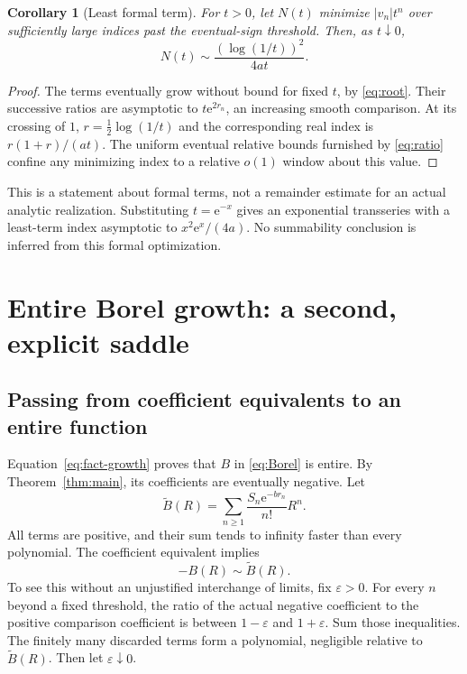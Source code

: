\documentclass[11pt,a4paper]{article}
\numberwithin{equation}{section}
\newtheorem{corollary}[theorem]{Corollary}
\theoremstyle{definition}
\theoremstyle{remark}\newtheorem{remark}[theorem]{Remark}
\newcommand{\ee}{\mathrm e}\newcommand{\dd}{\mathrm d}
\begin{document}
\begin{corollary}[Least formal term]
For $t>0$, let $N(t)$ minimize $|v_n|t^n$ over sufficiently large indices
past the eventual-sign threshold. Then, as $t\downarrow0$,
\begin{equation}
 N(t)\sim\frac{(\log(1/t))^2}{4at}.
 \label{eq:least}
\end{equation}
\end{corollary}
\begin{proof}
The terms eventually grow without bound for fixed $t$, by
\eqref{eq:root}. Their successive ratios are asymptotic to
$t\ee^{2r_n}$, an increasing smooth comparison.
At its crossing of $1$, $r=\frac12\log(1/t)$ and the corresponding real
index is $r(1+r)/(at)$. The uniform eventual relative bounds furnished by
\eqref{eq:ratio} confine any minimizing index to a relative $o(1)$
window about this value.
\end{proof}

This is a statement about formal terms, not a remainder estimate for an
actual analytic realization. Substituting $t=\ee^{-x}$ gives an exponential
transseries with a least-term index asymptotic to $x^2\ee^x/(4a)$.
No summability conclusion is inferred from this formal optimization.

\section{Entire Borel growth: a second, explicit saddle}
\label{sec:borel}

\subsection{Passing from coefficient equivalents to an entire function}
Equation~\eqref{eq:fact-growth} proves that $B$ in \eqref{eq:Borel} is entire.
By Theorem~\ref{thm:main}, its coefficients are eventually negative.
Let
\[
 \widetilde B(R)=\sum_{n\ge1}\frac{S_n\ee^{-br_n}}{n!}R^n.
\]
All terms are positive, and their sum tends to infinity faster than every
polynomial. The coefficient equivalent implies
\begin{equation}
 -B(R)\sim\widetilde B(R).
 \label{eq:Btransfer}
\end{equation}
To see this without an unjustified interchange of limits, fix $\varepsilon>0$.
For every $n$ beyond a fixed threshold, the ratio of the actual negative
coefficient to the positive comparison coefficient is between
$1-\varepsilon$ and $1+\varepsilon$. Sum those inequalities. The finitely
many discarded terms form a polynomial, negligible relative to
$\widetilde B(R)$. Then let $\varepsilon\downarrow0$.
\end{document}
